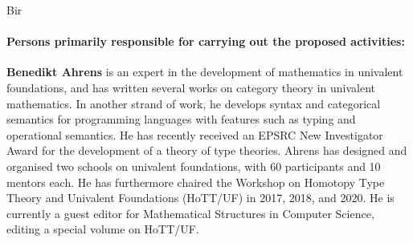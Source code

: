 \begin{sitedescription}{Bir}



\paragraph*{Persons primarily responsible for carrying out the proposed activities:}

\begin{compactitem}
 \item 
\textbf{Benedikt Ahrens} is an expert in the development of mathematics in univalent foundations, and has written several works on category theory in univalent mathematics.
In another strand of work, he develops syntax and categorical semantics for programming languages with features such as typing and operational semantics.
He has recently received an EPSRC New Investigator Award for the development of a theory of type theories.
Ahrens has designed and organised two schools on univalent foundations, with 60 participants and 10 mentors each. He has furthermore chaired the Workshop on Homotopy Type Theory and Univalent Foundations (HoTT/UF) in 2017, 2018, and 2020. He is currently a guest editor for Mathematical Structures in Computer Science, editing a special volume on HoTT/UF.
\end{compactitem}






\end{sitedescription}

